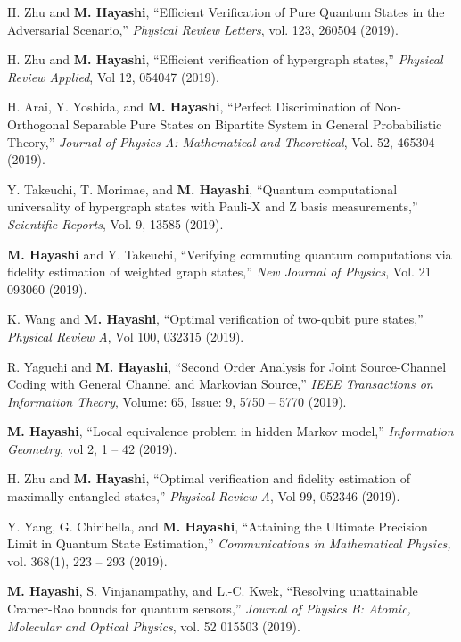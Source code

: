 \documentclass[a4paper,12pt,oneside]{article}
\begin{document}
\begin{enumerate}
H. Zhu and \textbf{M. Hayashi},
``Efficient Verification of Pure Quantum States in the Adversarial Scenario,''
{\em Physical Review Letters}, 
vol. 123, 260504 (2019).

H. Zhu and \textbf{M. Hayashi},
``Efficient verification of hypergraph states,''
{\em Physical Review Applied}, 
Vol 12, 054047 (2019).

H. Arai, Y. Yoshida, and \textbf{M. Hayashi},
``Perfect Discrimination of Non-Orthogonal Separable Pure States on Bipartite System in General Probabilistic Theory,''
{\em Journal of Physics A: Mathematical and Theoretical}, 
Vol. 52, 465304 (2019).

Y. Takeuchi, T. Morimae, and \textbf{M. Hayashi},
``Quantum computational
universality of hypergraph states with Pauli-X and Z basis measurements,''
{\em Scientific Reports}, Vol. 9, 13585 (2019).

\textbf{M. Hayashi} and Y. Takeuchi, 
``Verifying commuting quantum computations via fidelity estimation of weighted graph states,''
{\em New Journal of Physics}, Vol. 21 093060 (2019).

K. Wang and \textbf{M. Hayashi},
``Optimal verification of two-qubit pure states,''
{\em Physical Review A}, 
Vol 100, 032315 (2019).

R. Yaguchi and \textbf{M. Hayashi}, 
``Second Order Analysis for Joint Source-Channel Coding with General Channel and Markovian Source,''
{\em IEEE Transactions on Information Theory}, 
Volume: 65, Issue: 9, 5750 -- 5770 (2019). 

\textbf{M. Hayashi}, 
``Local equivalence problem in hidden Markov model,''
{\em Information Geometry}, 
vol 2, 1 -- 42 (2019). 

H. Zhu and \textbf{M. Hayashi}, 
``Optimal verification and fidelity estimation of maximally entangled states,''
{\em Physical Review A}, Vol 99, 052346 (2019).

Y. Yang, G. Chiribella, and \textbf{M. Hayashi}, 
``Attaining the Ultimate Precision Limit in Quantum State Estimation,''
{\em Communications in Mathematical Physics,}
vol. 368(1), 223 -- 293 (2019). 

\textbf{M. Hayashi}, S. Vinjanampathy, and L.-C. Kwek, 
``Resolving unattainable Cramer-Rao bounds for quantum sensors,''
{\em Journal of Physics B: Atomic, Molecular and Optical Physics},
vol. 52 015503 (2019). 


\end{enumerate}
\end{document}
